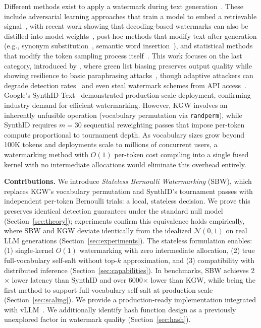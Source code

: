 \documentclass[11pt]{article}
\begin{document}
Different methods exist to apply a watermark during text generation~\cite{liu2024taxonomy,zhang2024watermarking}. These include adversarial learning approaches that train a model to embed a retrievable signal~\cite{abdelnabi2021awt,li2023plmmark}, with recent work showing that decoding-based watermarks can also be distilled into model weights~\cite{gu2024learnability}, post-hoc methods that modify text after generation (e.g., synonym substitution~\cite{munyer2023natural}, semantic word insertion~\cite{chang2024postmark}), and statistical methods that modify the token sampling process itself~\cite{kirchenbauer2023watermark,christ2023undetectable,kuditipudi2023robust,hu2023unbiased,wu2024dipmark,dathathri2024scalable,zhao2025permute}. This work focuses on the last category, introduced by \citet{kirchenbauer2023watermark}, where green list biasing preserves output quality while showing resilience to basic paraphrasing attacks~\cite{kirchenbauer2024reliability}, though adaptive attackers can degrade detection rates~\cite{diaa2025adaptive,rastogi2024revisiting} and even steal watermark schemes from API access~\cite{jovanovic2024stealing}. Google's SynthID-Text~\cite{dathathri2024scalable} demonstrated production-scale deployment, confirming industry demand for efficient watermarking. However, KGW involves an inherently unfusible operation (vocabulary permutation via \texttt{randperm}), while SynthID requires $m=30$ sequential reweighting passes that impose per-token compute proportional to tournament depth. As vocabulary sizes grow beyond 100K tokens and deployments scale to millions of concurrent users, a watermarking method with $O(1)$ per-token cost compiling into a single fused kernel with no intermediate allocations would eliminate this overhead entirely.

\newpage

\textbf{Contributions.} We introduce \emph{Stateless Bernoulli Watermarking} (SBW), which replaces KGW's vocabulary permutation and SynthID's tournament passes with independent per-token Bernoulli trials: a local, stateless decision. We prove this preserves identical detection guarantees under the standard null model (Section~\ref{sec:theory}); experiments confirm this equivalence holds empirically, where SBW and KGW deviate identically from the idealized $\mathcal{N}(0,1)$ on real LLM generations (Section~\ref{sec:experiments}). The stateless formulation enables: (1) single-kernel $O(1)$ watermarking with zero intermediate allocation, (2) true full-vocabulary self-salt without top-$k$ approximation, and (3) compatibility with distributed inference (Section~\ref{sec:capabilities}). In benchmarks, SBW achieves 2$\times$ lower latency than SynthID and over 6000$\times$ lower than KGW, while being the first method to support full-vocabulary self-salt at production scale (Section~\ref{sec:scaling}). We provide a production-ready implementation integrated with vLLM~\cite{kwon2023efficient}. We additionally identify hash function design as a previously unexplored factor in watermark quality (Section~\ref{sec:hash}).
\end{document}
